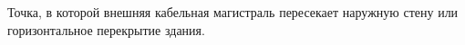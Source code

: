 Точка, в которой внешняя кабельная магистраль пересекает
наружную стену или горизонтальное перекрытие здания.